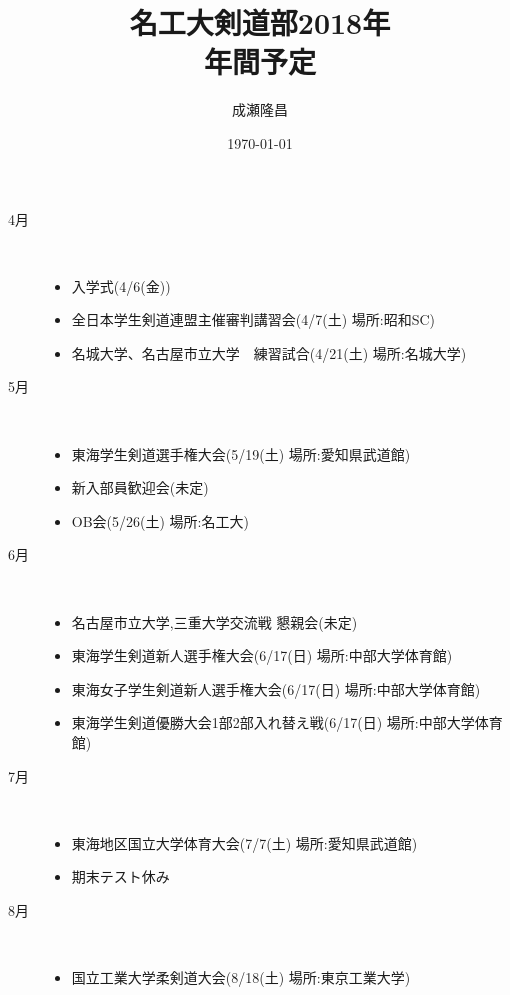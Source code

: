 \documentclass[12pt]{report}
\begin{document}
\begin{titlepage}
\title{名工大剣道部2018年\\年間予定}
\author{成瀬隆昌}
\date{\today}
\maketitle
\thispagestyle{empty}
\end{titlepage}
\begin{description}
\item[4月]~\\
\begin{itemize}
    \item 入学式(4/6(金))
    \item 全日本学生剣道連盟主催審判講習会(4/7(土) 場所:昭和SC)
    \item 名城大学、名古屋市立大学　練習試合(4/21(土) 場所:名城大学)
\end{itemize}
\item[5月]~\\
\begin{itemize}
    \item 東海学生剣道選手権大会(5/19(土) 場所:愛知県武道館)
    \item 新入部員歓迎会(未定)
    \item OB会(5/26(土) 場所:名工大)
\end{itemize}
\item[6月]~\\
\begin{itemize}
    \item 名古屋市立大学,三重大学交流戦 懇親会(未定)
    \item 東海学生剣道新人選手権大会(6/17(日) 場所:中部大学体育館)
    \item 東海女子学生剣道新人選手権大会(6/17(日) 場所:中部大学体育館)
    \item 東海学生剣道優勝大会1部2部入れ替え戦(6/17(日) 場所:中部大学体育館)
\end{itemize}
\item[7月]~\\
\begin{itemize}
    \item 東海地区国立大学体育大会(7/7(土) 場所:愛知県武道館)
    \item 期末テスト休み
\end{itemize}
\item[8月]~\\
\begin{itemize}
    \item 国立工業大学柔剣道大会(8/18(土) 場所:東京工業大学)

\end{itemize}
\end{description}
\end{document}
